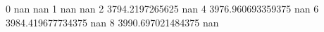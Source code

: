 0 nan nan
1 nan nan
2 3794.2197265625 nan
4 3976.960693359375 nan
6 3984.419677734375 nan
8 3990.697021484375 nan
